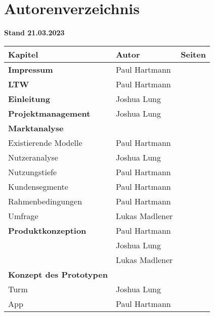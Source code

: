 \section{Autorenverzeichnis}

\textbf{Stand 21.03.2023}

\begin{longtable}{l|l|r}
  \textbf{Kapitel}                       & \textbf{Autor} & \textbf{Seiten} \\ \hline\hline
  \textbf{Impressum}                     & Paul Hartmann  &                     \\ \hline
  \textbf{LTW}                           & Paul Hartmann  &                     \\ \hline
  \textbf{Einleitung}                    & Joshua Lung    &                     \\ \hline
  \textbf{Projektmanagement}             & Joshua Lung    &                     \\ \hline
  \textbf{Marktanalyse}                  &                &                     \\ \hline
  Existierende Modelle                   & Paul Hartmann  &                     \\ \hline
  Nutzeranalyse                          & Joshua Lung    &                     \\ \hline
  Nutzungstiefe                          & Paul Hartmann  &                     \\ \hline
  Kundensegmente                         & Paul Hartmann  &                     \\ \hline
  Rahmenbedingungen                      & Paul Hartmann  &                     \\ \hline
  Umfrage                                & Lukas Madlener &                     \\ \hline
  \textbf{Produktkonzeption}             & Paul Hartmann  &                     \\
                                         & Joshua Lung    &                     \\
                                         & Lukas Madlener &                     \\ \hline
  \textbf{Konzept des Prototypen}        &                &                     \\ \hline
  Turm                                   & Joshua Lung    &                     \\ \hline
  App                                    & Paul Hartmann  &                     \\ \hline

\end{longtable}
